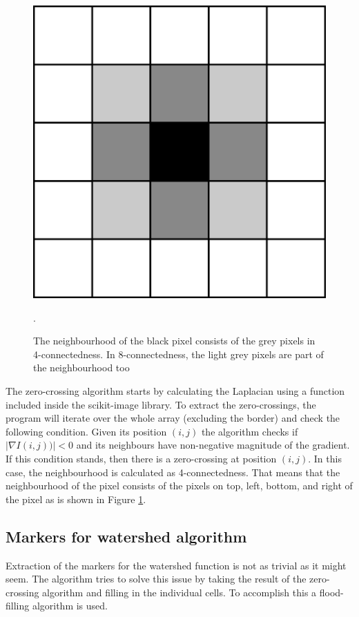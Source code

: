 \documentclass[
  digital,     %
  oneside,     %
  nosansbold,  %
  nocolorbold, %
  lof,         %
  lot,         %
]{fithesis4}
\begin{document}
\begin{figure}
    \begin{center}
        \includegraphics[width=0.3\linewidth]{resources/neighbourhood.png}
    \end{center}
    \caption{The neighbourhood of the black pixel consists of the grey pixels in
    4-connectedness. In 8-connectedness, the light grey pixels are part of the
    neighbourhood too}.
    \label{fig:neighbourhood}
\end{figure}

The zero-crossing algorithm starts by calculating the Laplacian using a function
included inside the scikit-image library. To
extract the zero-crossings, the program will iterate over the whole array
(excluding the border) and check the following condition. Given its position $(i, j)$
the algorithm checks if $|\nabla I(i, j))| < 0$ and its neighbours have
non-negative magnitude of the gradient.  If this condition stands, then there is
a zero-crossing at position $(i, j)$. In this case, the neighbourhood is
calculated as 4-connectedness. That means that the neighbourhood of the
pixel consists of the pixels on top, left, bottom, and right of the pixel as is
shown in Figure \ref{fig:neighbourhood}.

\subsection{Markers for watershed algorithm}
\label{sec-markers}
Extraction of the markers for the watershed function is not as trivial as it
might seem. The algorithm tries to solve this issue by taking the result of the
zero-crossing algorithm and filling in the individual cells. To accomplish this
a flood-filling algorithm is used.
\end{document}
